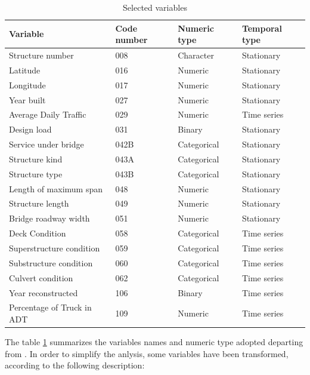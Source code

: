 \documentclass[]{book}
\theoremstyle{definition}
\theoremstyle{definition}
\theoremstyle{definition}
\theoremstyle{remark}
\begin{document}
\begin{table}[t]

\caption{\label{tab:tab-01}Selected variables}
\centering
\begin{tabular}{llll}
\toprule
Variable & Code number & Numeric type & Temporal type\\
\midrule
Structure number & 008 & Character & Stationary\\
Latitude & 016 & Numeric & Stationary\\
Longitude & 017 & Numeric & Stationary\\
Year built & 027 & Numeric & Stationary\\
Average Daily Traffic & 029 & Numeric & Time series\\
\addlinespace
Design load & 031 & Binary & Stationary\\
Service under bridge & 042B & Categorical & Stationary\\
Structure kind & 043A & Categorical & Stationary\\
Structure type & 043B & Categorical & Stationary\\
Length of maximum span & 048 & Numeric & Stationary\\
\addlinespace
Structure length & 049 & Numeric & Stationary\\
Bridge roadway width & 051 & Numeric & Stationary\\
Deck Condition & 058 & Categorical & Time series\\
Superstructure condition & 059 & Categorical & Time series\\
Substructure condition & 060 & Categorical & Time series\\
\addlinespace
Culvert condition & 062 & Categorical & Time series\\
Year reconstructed & 106 & Binary & Time series\\
Percentage of Truck in ADT & 109 & Numeric & Time series\\
\bottomrule
\end{tabular}
\end{table}

The table \ref{tab:tab-01} summarizes the variables names and numeric
type adopted departing from \citet{wesemanRecordingCodingGuide1995}. In
order to simplify the anlysis, some variables have been transformed,
according to the following description:
\end{document}
